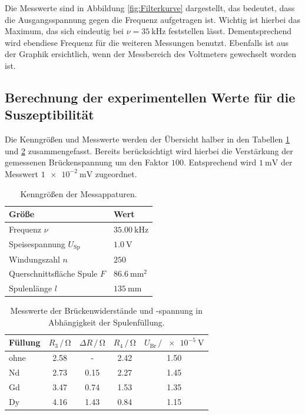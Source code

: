     Die Messwerte sind in Abbildung \ref{fig:Filterkurve} dargestellt, das bedeutet, dass die Ausgangsspannung gegen die Frequenz aufgetragen ist. 
    Wichtig ist hierbei das Maximum, das sich eindeutig bei $\nu=\SI{35}{\kilo\hertz}$ feststellen lässt. 
    Dementsprechend wird ebendiese Frequenz für die weiteren Messungen benutzt. 
    Ebenfalls ist aus der Graphik ersichtlich, wenn der Messbereich des Voltmeters gewechselt worden ist. 

\subsection{Berechnung der experimentellen Werte für die Suszeptibilität}

    Die Kenngrößen und Messwerte werden der Übersicht halber in den Tabellen \ref{tab:KennGr} und \ref{tab:Messwerte} zusammengefasst.
    Bereits berücksichtigt wird hierbei die Verstärkung der gemessenen Brückenspannung um den Faktor $100$. Entsprechend 
    wird $\SI{1}{\milli\volt}$ der Messwert $\SI{1e-2}{\milli\volt}$ zugeordnet.
    \begin{table}
        \centering
        \caption{Kenngrößen der Messappaturen.}
        \label{tab:KennGr}
        \begin{tabular}{l l}
            \toprule
            Größe & Wert \\
            \midrule
            Frequenz $\nu$                  & $\SI{35.00}{\kilo\hertz}$ \\
            Speisespannung $U_\text{Sp}$    & $\SI{1.0}{\volt}$ \\
            Windungszahl $n$                & $\num{250}$ \\
            Querschnittsfläche Spule $F$          & $\SI{86.6}{\milli\meter\squared}$ \\
            Spulenlänge $l$                 & $\SI{135}{\milli\meter}$ \\
            \bottomrule
        \end{tabular}
    \end{table}
    \begin{table}
        \centering
        \caption{Messwerte der Brückenwiderstände und -spannung in Abhängigkeit der Spulenfüllung.}
        \label{tab:Messwerte}
        \begin{tabular}{l c c c c}
            \toprule
            Füllung & $R_3\,/\,\si{\ohm}$ & $\Delta R\,/\,\si{\ohm}$ & $R_4\,/\,\si{\ohm}$ & $U_\text{Br}\,/\,\SI{e-5}{\volt}$ \\
            \midrule
            ohne    & 2.58 &  -   & 2.42 & 1.50 \\ 
            Nd      & 2.73 & 0.15 & 2.27 & 1.45 \\
            Gd      & 3.47 & 0.74 & 1.53 & 1.35 \\
            Dy      & 4.16 & 1.43 & 0.84 & 1.15 \\
            \bottomrule
        \end{tabular}
    \end{table}
    
